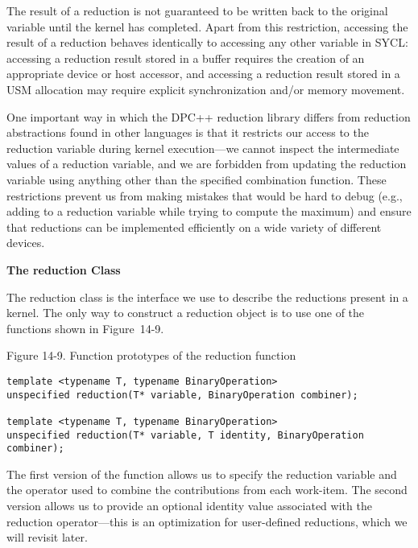The result of a reduction is not guaranteed to be written back to the original variable until the kernel has completed. Apart from this restriction, accessing the result of a reduction behaves identically to accessing any other variable in SYCL: accessing a reduction result stored in a buffer requires the creation of an appropriate device or host accessor, and accessing a reduction result stored in a USM allocation may require explicit synchronization and/or memory movement.\par

One important way in which the DPC++ reduction library differs from reduction abstractions found in other languages is that it restricts our access to the reduction variable during kernel execution—we cannot inspect the intermediate values of a reduction variable, and we are forbidden from updating the reduction variable using anything other than the specified combination function. These restrictions prevent us from making mistakes that would be hard to debug (e.g., adding to a reduction variable while trying to compute the maximum) and ensure that reductions can be implemented efficiently on a wide variety of different devices.\par

\hspace*{\fill} \par %
\textbf{The reduction Class}

The reduction class is the interface we use to describe the reductions present in a kernel. The only way to construct a reduction object is to use one of the functions shown in Figure 14-9.\par

\hspace*{\fill} \par %
Figure 14-9. Function prototypes of the reduction function
\begin{lstlisting}[caption={}]
template <typename T, typename BinaryOperation>
unspecified reduction(T* variable, BinaryOperation combiner);

template <typename T, typename BinaryOperation>
unspecified reduction(T* variable, T identity, BinaryOperation combiner);
\end{lstlisting}

The first version of the function allows us to specify the reduction variable and the operator used to combine the contributions from each work-item. The second version allows us to provide an optional identity value associated with the reduction operator—this is an optimization for user-defined reductions, which we will revisit later.\par

